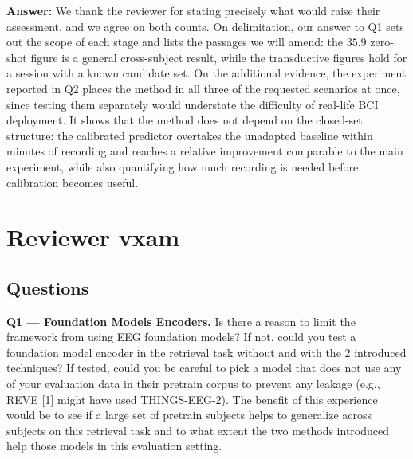 \documentclass[11pt]{article}
\newcommand{\answer}[1]{{\textbf{Answer:} \color{blue} #1}}
\begin{document}
\answer{
We thank the reviewer for stating precisely what would raise their assessment, and we agree on both
counts. On delimitation, our answer to Q1 sets out the scope of each stage and lists the passages we
will amend: the $35.9$ zero-shot figure is a general cross-subject result, while the transductive
figures hold for a session with a known candidate set. On the additional evidence, the experiment
reported in Q2 places the method in all three of the requested scenarios at once, since testing them
separately would understate the difficulty of real-life BCI deployment. It shows that the method does
not depend on the closed-set structure: the calibrated predictor overtakes the unadapted baseline
within minutes of recording and reaches a relative improvement comparable to the main experiment,
while also quantifying how much recording is needed before calibration becomes useful.
}

\section{Reviewer vxam}

\subsection{Questions}

\textbf{Q1 --- Foundation Models Encoders.} Is there a reason to limit the framework from using EEG
foundation models? If not, could you test a foundation model encoder in the retrieval task without and
with the 2 introduced techniques? If tested, could you be careful to pick a model that does not use any
of your evaluation data in their pretrain corpus to prevent any leakage (e.g., REVE [1] might have used
THINGS-EEG-2). The benefit of this experience would be to see if a large set of pretrain subjects helps
to generalize across subjects on this retrieval task and to what extent the two methods introduced help
those models in this evaluation setting.
\end{document}
